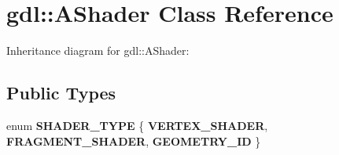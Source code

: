 \hypertarget{classgdl_1_1_a_shader}{}\section{gdl\+:\+:A\+Shader Class Reference}
\label{classgdl_1_1_a_shader}


Inheritance diagram for gdl\+:\+:A\+Shader\+:
\subsection*{Public Types}
\begin{DoxyCompactItemize}
\item 
\hypertarget{classgdl_1_1_a_shader_a21924b9a44218cc65044f4edb385c9e9}{}enum {\bfseries S\+H\+A\+D\+E\+R\+\_\+\+T\+Y\+P\+E} \{ {\bfseries V\+E\+R\+T\+E\+X\+\_\+\+S\+H\+A\+D\+E\+R}, 
{\bfseries F\+R\+A\+G\+M\+E\+N\+T\+\_\+\+S\+H\+A\+D\+E\+R}, 
{\bfseries G\+E\+O\+M\+E\+T\+R\+Y\+\_\+\+I\+D}
 \}\label{classgdl_1_1_a_shader_a21924b9a44218cc65044f4edb385c9e9}

\end{DoxyCompactItemize}
